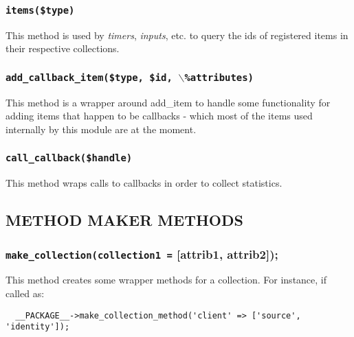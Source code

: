 \documentclass[12pt,a4paper]{article}
\begin{document}
\subsubsection*{\texttt{items(\$type)}\label{xPL::Base_items_type_}}


This method is used by \emph{timers}, \emph{inputs}, etc. to query
the ids of registered items in their respective collections.

\subsubsection*{\texttt{add\_callback\_item(\$type, \$id, $\backslash$\%attributes)}\label{xPL::Base_add_callback_item_type_id_backslash_attributes_}}


This method is a wrapper around \textsf{add\_item} to handle some
functionality for adding items that happen to be callbacks - which
most of the items used internally by this module are at the moment.

\subsubsection*{\texttt{call\_callback(\$handle)}\label{xPL::Base_call_callback_handle_}}


This method wraps calls to callbacks in order to collect statistics.

\subsection*{METHOD MAKER METHODS\label{xPL::Base_METHOD_MAKER_METHODS}}
\subsubsection*{\texttt{make\_collection(collection1 =} [attrib1, attrib2]);\label{xPL::Base_make_collection_collection1_attrib1_attrib2_}}


This method creates some wrapper methods for a collection.  For instance,
if called as:

\begin{verbatim}
  __PACKAGE__->make_collection_method('client' => ['source', 'identity']);
\end{verbatim}
\end{document}
